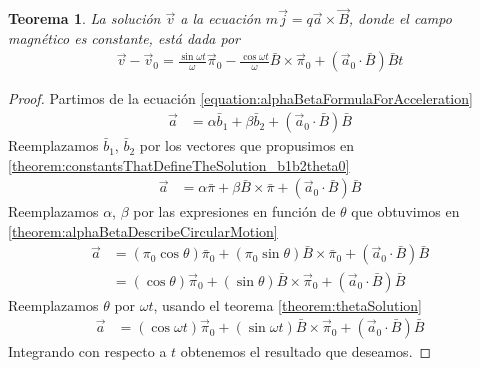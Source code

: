 \documentclass{article}
\newtheorem{theorem}{Teorema}
\begin{document}
  \begin{theorem}
    La solución \(\vec{v}\) a la ecuación \(m \vec{j} = q \vec{a} \times \vec{B}\), donde el campo magnético es constante, está dada por
    \begin{align}
      \vec{v} - \vec{v}_0
      =
      \frac{\sin \omega t}{\omega}
      \vec{\pi}_0
      - \frac{\cos \omega t}{\omega}
      \bar{B}
      \times
      \vec{\pi}_0
      + (\vec{a}_0 \cdot \bar{B}) \bar{B} t
    \end{align}
  \end{theorem}
  \begin{proof}
    Partimos de la ecuación \eqref{equation:alphaBetaFormulaForAcceleration}
    \begin{align}
      \vec{a}
      &=
      \alpha \bar{b}_1 + \beta \bar{b}_2 + (\vec{a}_0 \cdot \bar{B}) \bar{B}
    \end{align}
    Reemplazamos \(\bar{b}_1\), \(\bar{b}_2\) por los vectores que propusimos en \ref{theorem:constantsThatDefineTheSolution_b1b2theta0}
    \begin{align}
      \vec{a}
      &=
      \alpha \bar{\pi} + \beta \bar{B} \times \bar{\pi} + (\vec{a}_0 \cdot \bar{B}) \bar{B}
    \end{align}
    Reemplazamos \(\alpha\), \(\beta\) por las expresiones en función de \(\theta\) que obtuvimos en \ref{theorem:alphaBetaDescribeCircularMotion}
    \begin{align}
      \vec{a}
      &=
      (\pi_0 \cos \theta) \bar{\pi}_0 + (\pi_0 \sin \theta) \bar{B} \times \bar{\pi}_0 + (\vec{a}_0 \cdot \bar{B}) \bar{B}
      \\
      &=
      (\cos \theta) \vec{\pi}_0 + (\sin \theta) \bar{B} \times \vec{\pi}_0 + (\vec{a}_0 \cdot \bar{B}) \bar{B}
    \end{align}
    Reemplazamos \(\theta\) por \(\omega t\), usando el teorema \ref{theorem:thetaSolution}
    \begin{align}
      \vec{a}
      &=
      (\cos \omega t) \vec{\pi}_0
      + (\sin \omega t) \bar{B} \times \vec{\pi}_0
      + (\vec{a}_0 \cdot \bar{B}) \bar{B}
    \end{align}
    Integrando con respecto a \(t\) obtenemos el resultado que deseamos. 
  \end{proof}
\end{document}
